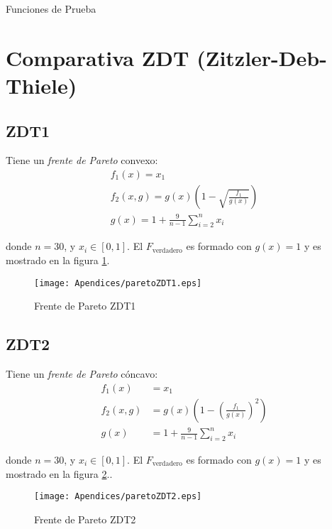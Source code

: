 

\begin{chapter}{Funciones de Prueba}

\section{Comparativa ZDT (Zitzler-Deb-Thiele)} 

\subsection*{ZDT1}

Tiene un {\it frente de Pareto} convexo:\\

\begin{align*}
f_1(x)=x_1\\
f_2(x,g)=g(x)(1-\sqrt{ \frac{f_1}{g(x)}})\\
g(x)=1+\frac{9}{n-1}\sum_{i=2}^nx_i
\end{align*}

donde $n=30$, y $x_i\in[0,1]$. El $F_\text{verdadero}$ es formado con $g(x)=1$ y es mostrado en la figura \ref{fig:ZDT1}.

\begin{figure}[h!]
 \centering
\texttt{[image: Apendices/paretoZDT1.eps]}
\caption{Frente de Pareto ZDT1}
\label{fig:ZDT1}
\end{figure} 

\subsection*{ZDT2}

Tiene un {\it frente de Pareto} c\'oncavo:\\

\begin{align*}
f_1(x)&=x_1\\
f_2(x,g)&=g(x)(1-( \frac{f_1}{g(x)})^2)\\
g(x)&=1+\frac{9}{n-1}\sum_{i=2}^nx_i
\end{align*}

donde $n=30$, y $x_i\in[0,1]$. El $F_\text{verdadero}$ es formado con $g(x)=1$ y es mostrado en la figura \ref{fig:ZDT2}..


\begin{figure}[h!]
 \centering
\texttt{[image: Apendices/paretoZDT2.eps]}
\caption{Frente de Pareto ZDT2}
\label{fig:ZDT2}
\end{figure} 


\end{chapter}
